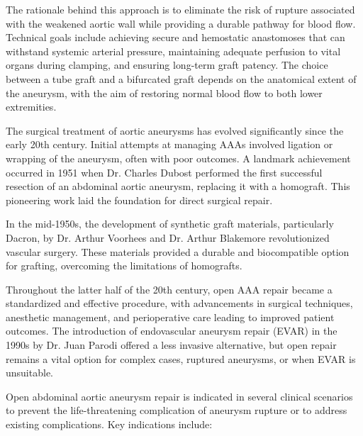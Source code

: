 The rationale behind this approach is to eliminate the risk of rupture associated with the weakened aortic wall while providing a durable pathway for blood flow. Technical goals include achieving secure and hemostatic anastomoses that can withstand systemic arterial pressure, maintaining adequate perfusion to vital organs during clamping, and ensuring long-term graft patency. The choice between a tube graft and a bifurcated graft depends on the anatomical extent of the aneurysm, with the aim of restoring normal blood flow to both lower extremities.

The surgical treatment of aortic aneurysms has evolved significantly since the early 20th century. Initial attempts at managing AAAs involved ligation or wrapping of the aneurysm, often with poor outcomes. A landmark achievement occurred in 1951 when Dr. Charles Dubost performed the first successful resection of an abdominal aortic aneurysm, replacing it with a homograft. This pioneering work laid the foundation for direct surgical repair.

In the mid-1950s, the development of synthetic graft materials, particularly Dacron, by Dr. Arthur Voorhees and Dr. Arthur Blakemore revolutionized vascular surgery. These materials provided a durable and biocompatible option for grafting, overcoming the limitations of homografts.

Throughout the latter half of the 20th century, open AAA repair became a standardized and effective procedure, with advancements in surgical techniques, anesthetic management, and perioperative care leading to improved patient outcomes. The introduction of endovascular aneurysm repair (EVAR) in the 1990s by Dr. Juan Parodi offered a less invasive alternative, but open repair remains a vital option for complex cases, ruptured aneurysms, or when EVAR is unsuitable.

Open abdominal aortic aneurysm repair is indicated in several clinical scenarios to prevent the life-threatening complication of aneurysm rupture or to address existing complications. Key indications include:

